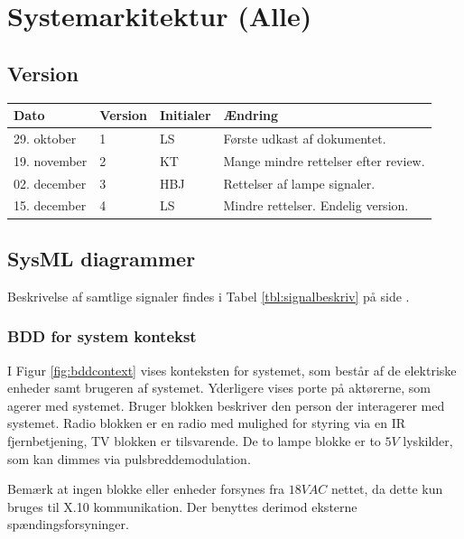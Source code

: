 \chapter{Systemarkitektur (Alle)}

\section{Version}
\begin{table}[h]
	\centering
	\begin{tabularx}{\textwidth - 2cm}{|l|l| l|X|}
	\hline
	Dato	& Version	& Initialer & Ændring	\\ \hline
	29. oktober & 1 & LS	& Første udkast af dokumentet. \\ \hline
	19. november & 2 & KT & Mange mindre rettelser efter review. \\ \hline
	02. december & 3 & HBJ & Rettelser af lampe signaler. \\ \hline
	15. december & 4 & LS & Mindre rettelser. Endelig version. \\ \hline
	\end{tabularx}
\end{table}

\section{SysML diagrammer}
Beskrivelse af samtlige signaler findes i Tabel \ref{tbl:signalbeskriv} på side \pageref{tbl:signalbeskriv}.

\subsection{BDD for system kontekst}

I Figur \ref{fig:bddcontext} vises konteksten for systemet, som består af de elektriske enheder samt brugeren af systemet. Yderligere vises porte på aktørerne, som agerer med systemet. Bruger blokken beskriver den person der interagerer med systemet. Radio blokken er en radio med mulighed for styring via en IR fjernbetjening, TV blokken er tilsvarende. De to lampe blokke er to $5V$ lyskilder, som kan dimmes via pulsbreddemodulation.

Bemærk at ingen blokke eller enheder forsynes fra $18 VAC$ nettet, da dette kun bruges til X.10 kommunikation. Der benyttes derimod eksterne spændingsforsyninger.

